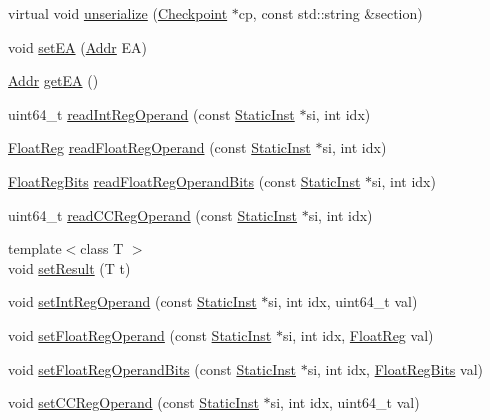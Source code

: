 \begin{DoxyCompactItemize}
\item 
virtual void \hyperlink{classCheckerCPU_af100c4e9feabf3cd918619c88c718387}{unserialize} (\hyperlink{classCheckpoint}{Checkpoint} $\ast$cp, const std::string \&section)
\item 
void \hyperlink{classCheckerCPU_a2f9742f8d2bcf6a31ebfc121fd9d5fbc}{setEA} (\hyperlink{base_2types_8hh_af1bb03d6a4ee096394a6749f0a169232}{Addr} EA)
\item 
\hyperlink{base_2types_8hh_af1bb03d6a4ee096394a6749f0a169232}{Addr} \hyperlink{classCheckerCPU_a840be0f7fe0a7a50b37b0552fe6ca506}{getEA} ()
\item 
uint64\_\-t \hyperlink{classCheckerCPU_a9e7b0a4d5373c48902425c9456b19e7e}{readIntRegOperand} (const \hyperlink{classStaticInst}{StaticInst} $\ast$si, int idx)
\item 
\hyperlink{classCheckerCPU_a75484259f1855aabc8d74c6eb1cfe186}{FloatReg} \hyperlink{classCheckerCPU_a717c88c8c56d79c9ed554ba5992bd8c3}{readFloatRegOperand} (const \hyperlink{classStaticInst}{StaticInst} $\ast$si, int idx)
\item 
\hyperlink{classCheckerCPU_aab5eeae86499f9bfe15ef79360eccc64}{FloatRegBits} \hyperlink{classCheckerCPU_a39d93624e4481f4a210f2c46ea6b15b0}{readFloatRegOperandBits} (const \hyperlink{classStaticInst}{StaticInst} $\ast$si, int idx)
\item 
uint64\_\-t \hyperlink{classCheckerCPU_a25532f176443f0ec538a3b833c55f4a0}{readCCRegOperand} (const \hyperlink{classStaticInst}{StaticInst} $\ast$si, int idx)
\item 
{\footnotesize template$<$class T $>$ }\\void \hyperlink{classCheckerCPU_accfdfc918ee73975e86b08cf8a528479}{setResult} (T t)
\item 
void \hyperlink{classCheckerCPU_a654e99f2be7cd298378462ce9651bb44}{setIntRegOperand} (const \hyperlink{classStaticInst}{StaticInst} $\ast$si, int idx, uint64\_\-t val)
\item 
void \hyperlink{classCheckerCPU_addc8b4b6511725bf8ff48bd09ef22892}{setFloatRegOperand} (const \hyperlink{classStaticInst}{StaticInst} $\ast$si, int idx, \hyperlink{classCheckerCPU_a75484259f1855aabc8d74c6eb1cfe186}{FloatReg} val)
\item 
void \hyperlink{classCheckerCPU_a80a516966713c873cf964af7538dbd37}{setFloatRegOperandBits} (const \hyperlink{classStaticInst}{StaticInst} $\ast$si, int idx, \hyperlink{classCheckerCPU_aab5eeae86499f9bfe15ef79360eccc64}{FloatRegBits} val)
\item 
void \hyperlink{classCheckerCPU_afeb2b876cf6b29215cf9d6d56ba8863b}{setCCRegOperand} (const \hyperlink{classStaticInst}{StaticInst} $\ast$si, int idx, uint64\_\-t val)

\end{DoxyCompactItemize}
